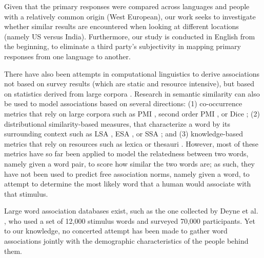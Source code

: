 \documentclass[11pt,letterpaper]{article}
\newcommand{\FIXME}[1]{\textcolor{red}{#1}}
\begin{document}
Given that the primary responses were compared across languages and people with a relatively common origin (West European), our work seeks to investigate whether similar results are encountered when looking at different locations (namely US versus India). Furthermore, our study is conducted in English from the beginning, to eliminate a third party's subjectivity in mapping primary responses from one language to another. %

There have also been attempts in computational linguistics to derive associations not based on survey results (which are static and resource intensive), but based on statistics derived from large corpora \cite{Church89,Wettler89,Church90}. Research in semantic similarity can also be used to model associations based on several directions: (1) co-occurrence metrics that rely on large corpora such as PMI \cite{Church90}, second order PMI \cite{Islam2008}, or Dice \cite{Dice1945}; (2) distributional similarity-based measures, that characterize a word by its surrounding context such as LSA \cite{Landauer1997}, ESA \cite{Gabrilovich2007}, or SSA \cite{Hassan2011}; and  (3) knowledge-based metrics that rely on resources such as lexica or thesauri \cite{Leacock1998,Lesk1986,Jarmasz2003,Hughes2007}. However, most of these metrics have so far been applied to model the relatedness between two words, namely given a word pair, to score how similar the two words are; as such, they have not been used to predict free association norms, namely given a word, to attempt to determine the most likely word that a human would associate with that stimulus. 


Large word association databases exist, such as the one collected by Deyne et al. , who used a set of 12,000 stimulus words and surveyed 70,000 participants. Yet to our knowledge, no concerted attempt has been made to gather word associations jointly with the demographic characteristics of the people behind them.
\end{document}
